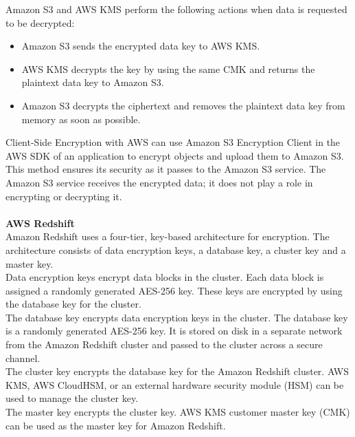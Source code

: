 \documentclass[10pt]{article}
\begin{document}
Amazon S3 and AWS KMS perform the following actions when data is requested to be decrypted:
\begin{itemize}
    \item Amazon S3 sends the encrypted data key to AWS KMS.
    \item AWS KMS decrypts the key by using the same CMK and returns the plaintext data key to Amazon S3.
    \item Amazon S3 decrypts the ciphertext and removes the plaintext data key from memory as soon as possible.
\end{itemize}

Client-Side Encryption with AWS can use Amazon S3 Encryption Client in the AWS SDK of an application to encrypt objects and upload them to Amazon S3. This method ensures its security as it passes to the Amazon S3 service. The Amazon S3 service receives the encrypted data; it does not play a role in encrypting or decrypting it.
\\\\\textbf{AWS Redshift}\\
Amazon Redshift uses a four-tier, key-based architecture for encryption. The architecture consists of data encryption keys, a database key, a cluster key and a master key.
\\
Data encryption keys encrypt data blocks in the cluster. Each data block is assigned a randomly generated AES-256 key. These keys are encrypted by using the database key for the cluster.
\\
The database key encrypts data encryption keys in the cluster. The database key is a randomly generated AES-256 key. It is stored on disk in a separate network from the Amazon Redshift cluster and passed to the cluster across a secure channel.
\\
The cluster key encrypts the database key for the Amazon Redshift cluster.  AWS KMS, AWS CloudHSM, or an external hardware security module (HSM) can be used to manage the cluster key.
\\
The master key encrypts the cluster key. AWS KMS customer master key (CMK) can be used as the master key for Amazon Redshift.
\end{document}
